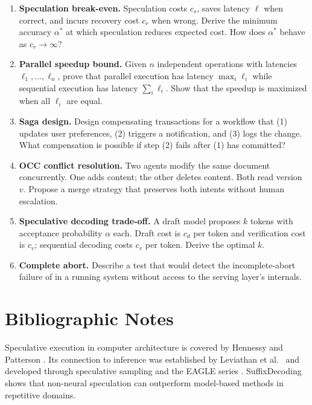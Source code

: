 \documentclass[11pt]{book}
\begin{document}
\begin{enumerate}
\item \textbf{Speculation break-even.} Speculation costs $c_s$, saves latency $\ell$ when correct, and incurs recovery cost $c_r$ when wrong. Derive the minimum accuracy $\alpha^*$ at which speculation reduces expected cost. How does $\alpha^*$ behave as $c_r \rightarrow \infty$?

\item \textbf{Parallel speedup bound.} Given $n$ independent operations with latencies $\ell_1,\dots,\ell_n$, prove that parallel execution has latency $\max_i \ell_i$ while sequential execution has latency $\sum_i \ell_i$. Show that the speedup is maximized when all $\ell_i$ are equal.

\item \textbf{Saga design.} Design compensating transactions for a workflow that (1) updates user preferences, (2) triggers a notification, and (3) logs the change. What compensation is possible if step (2) fails after (1) has committed?

\item \textbf{OCC conflict resolution.} Two agents modify the same document concurrently. One adds content; the other deletes content. Both read version $v$. Propose a merge strategy that preserves both intents without human escalation.

\item \textbf{Speculative decoding trade-off.} A draft model proposes $k$ tokens with acceptance probability $\alpha$ each. Draft cost is $c_d$ per token and verification cost is $c_v$; sequential decoding costs $c_v$ per token. Derive the optimal $k$.

\item \textbf{Complete abort.} Describe a test that would detect the incomplete-abort failure of \cite{abortedkv2026} in a running system without access to the serving layer's internals.
\end{enumerate}

\section*{Bibliographic Notes}

Speculative execution in computer architecture is covered by Hennessy and Patterson \cite{hennessy2017computer}. Its connection to inference was established by Leviathan et al.\ \cite{leviathan2023fast} and developed through speculative sampling and the EAGLE series \cite{li2024eagle, li2024eagle2, li2025eagle3}. SuffixDecoding \cite{wang2024suffixdecoding} shows that non-neural speculation can outperform model-based methods in repetitive domains.
\end{document}
